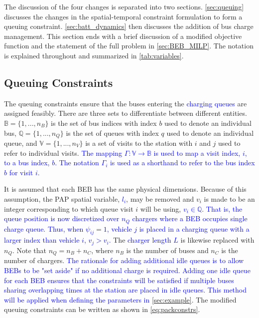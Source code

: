 \documentclass[utf8]{FrontiersinHarvard}
\begin{document}
The discussion of the four changes is separated into two sections. \autoref{sec:queuing} discusses the changes in the
spatial-temporal constraint formulation to form a queuing constraint. \autoref{sec:batt_dynamics} then discusses the
addition of bus charge management. This section ends with a brief discussion of a modified objective function and the
statement of the full problem in \autoref{sec:BEB_MILP}. The notation is explained throughout and summarized in
\autoref{tab:variables}.

\subsection{Queuing Constraints}
\label{sec:queuing}
\noindent The queuing constraints ensure that the buses entering the \textcolor{blue}{charging queues} are assigned
feasibly. There are three sets to differentiate between different entities. \(\mathbb{B} = \{1, ..., n_B\}\) is the set of
bus indices with index \(b\) used to denote an individual bus, \(\mathbb{Q} = \{1, ..., n_Q\}\) is the set of queues with index \(q\)
used to denote an individual queue, and \(\mathbb{V} = \{1, ..., n_V\}\) is a set of visits to the station with \(i\) and
\(j\) used to refer to individual visits. \textcolor{blue}{The mapping $\Gamma: \mathbb{V} \rightarrow \mathbb{B}$ is used to map a visit index, $i$, to a bus index, $b$. The notation $\Gamma_i$ is used as a shorthand to refer to the bus index $b$ for visit $i$.}

It is assumed that each BEB has the same physical dimensions. Because of this assumption, the PAP spatial variable,
\textcolor{blue}{$l_i$}, may be removed and \(v_i\) is made to be an integer corresponding to which queue visit \(i\) will
be using, \textcolor{blue}{$v_i \in \mathbb{Q}$}. \textcolor{blue}{That is, the queue position is now discretized over $n_Q$ chargers where a BEB occupies single charge queue. Thus, when $\psi_{ij} = 1$, vehicle $j$ is placed in a charging queue with a larger index than vehicle $i$, $v_j > v_i$.} The \textcolor{blue}{charger length $L$} is
likewise replaced with \(n_Q\). Note that \(n_Q = n_B + n_C\), where \(n_B\) is the number of buses and \(n_C\) is the number of
chargers. \textcolor{blue}{The rationale for adding additional idle queues is to allow BEBs to be "set aside" if no additional charge is required. Adding one idle queue for each BEB ensures that the constraints will be satisfied if multiple buses sharing overlapping times at the station are placed in idle queues. This method will be applied when defining the parameters in {\autoref{sec:example}}}. The modified queuing constraints can be written as shown in
\autoref{eq:packconstrs}.
\end{document}

